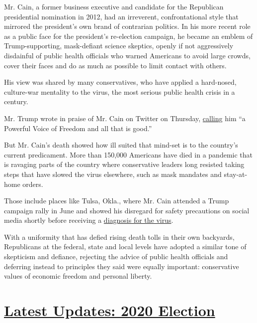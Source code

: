 Mr. Cain, a former business executive and candidate for the Republican
presidential nomination in 2012, had an irreverent, confrontational
style that mirrored the president's own brand of contrarian politics. In
his more recent role as a public face for the president's re-election
campaign, he became an emblem of Trump-supporting, mask-defiant science
skeptics, openly if not aggressively disdainful of public health
officials who warned Americans to avoid large crowds, cover their faces
and do as much as possible to limit contact with others.

His view was shared by many conservatives, who have applied a
hard-nosed, culture-war mentality to the virus, the most serious public
health crisis in a century.

Mr. Trump wrote in praise of Mr. Cain on Twitter on Thursday,
\href{https://twitter.com/realDonaldTrump/status/1288907916020461569?s=20}{calling}
him ``a Powerful Voice of Freedom and all that is good.''

But Mr. Cain's death showed how ill suited that mind-set is to the
country's current predicament. More than 150,000 Americans have died in
a pandemic that is ravaging parts of the country where conservative
leaders long resisted taking steps that have slowed the virus elsewhere,
such as mask mandates and stay-at-home orders.

Those include places like Tulsa, Okla., where Mr. Cain attended a Trump
campaign rally in June and showed his disregard for safety precautions
on social media shortly before receiving a
\href{https://www.nytimes3xbfgragh.onion/2020/07/02/us/politics/herman-cain-coronavirus.html}{diagnosis
for the virus}.

With a uniformity that has defied rising death tolls in their own
backyards, Republicans at the federal, state and local levels have
adopted a similar tone of skepticism and defiance, rejecting the advice
of public health officials and deferring instead to principles they said
were equally important: conservative values of economic freedom and
personal liberty.

\hypertarget{latest-updates-2020-election}{%
\section{\texorpdfstring{\href{https://www.nytimes3xbfgragh.onion/2020/07/31/us/elections/biden-vs-trump.html?action=click\&pgtype=Article\&state=default\&region=MAIN_CONTENT_1\&context=storylines_live_updates}{Latest
Updates: 2020
Election}}{Latest Updates: 2020 Election}}\label{latest-updates-2020-election}}

